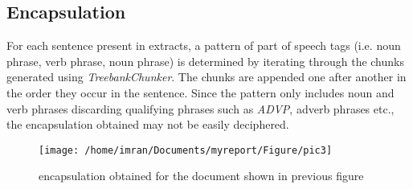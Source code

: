 \subsection{Encapsulation}
For each sentence present in extracts, a pattern of part of speech tags (i.e. noun phrase, verb phrase, noun phrase) is determined by iterating through the chunks 
generated using \emph{TreebankChunker}. The chunks are appended one after another in the order they occur in the sentence. Since the pattern only includes noun and verb
phrases discarding qualifying phrases such as \emph{ADVP}, adverb phrases etc., the encapsulation obtained may not be easily deciphered.

\begin{figure}[h]
 \texttt{[image: /home/imran/Documents/myreport/Figure/pic3]}
 \caption{\singlespace encapsulation obtained for the document shown in previous figure}
\end{figure}
